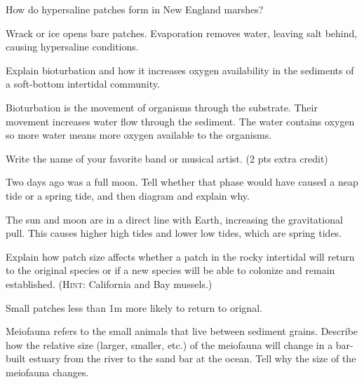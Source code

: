 \documentclass[11pt, addpoints]{exam}
\newcommand*\AnswerBox[2]{%
    \parbox[t][#1]{0.92\textwidth}{%
    \begin{solution}#2\end{solution}}
    \vspace{\stretch{1}}
}
\newlength{\basespace}
\begin{document}
\begin{questions}
{\question[5]
How do hypersaline patches form in New England marshes?

\AnswerBox{\basespace}{Wrack or ice opens bare patches. Evaporation removes water, leaving salt behind, causing hypersaline conditions.}

\question[5]
Explain bioturbation and how it increases oxygen availability in the sediments of a soft-bottom intertidal community.

\AnswerBox{0.5\basespace}{Bioturbation is the movement of organisms through the substrate. Their movement increases water flow through the sediment. The water contains oxygen so more water means more oxygen available to the organisms.}

\bonusquestion
Write the name of your favorite band or musical artist. (2 pts extra credit)


\newpage


\question[8]
Two days ago was a full moon. Tell whether that phase would have caused a neap tide or a spring tide, and then diagram and explain why.

\AnswerBox{2\basespace}{The sun and moon are in a direct line with Earth, increasing the gravitational pull. This causes higher high tides and lower low tides, which are spring tides.}

\question[10]
Explain how patch size affects whether a patch in the rocky intertidal will return to the original species or if a new species will be able to colonize and remain established. (\textsc{Hint:} California and Bay mussels.)


\AnswerBox{2\basespace}{Small patches less than 1m more likely to return to orignal.
}


\newpage


%


\question[15]
Meiofauna refers to the small animals that live between sediment grains. Describe how the relative size (larger, smaller, etc.) of the meiofauna will change in a bar-built estuary from the river to the sand bar at the ocean. Tell why the size of the meiofauna changes.


}
\end{questions}
\end{document}

